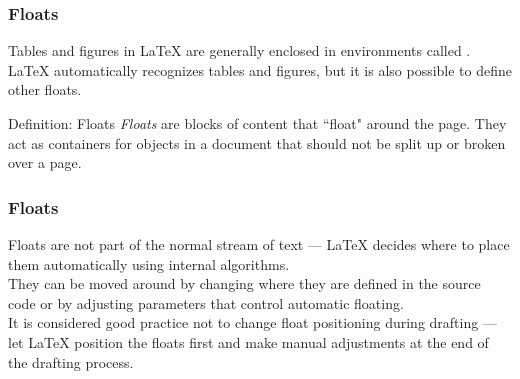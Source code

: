 \begin{frame}[fragile]
\frametitle{Floats}
Tables and figures in \LaTeX{} are generally enclosed in environments called . \\[\baselineskip] \pause
\LaTeX{} automatically recognizes tables and figures, but it is also possible to define other floats. \\ \pause
\begin{block}{Definition: Floats}
    \emph{Floats} are blocks of content that ``float" around the page. They act as containers for objects in a document that should not be split up or broken over a page.
\end{block} 
\end{frame}


\begin{frame}[fragile]
\frametitle{Floats}
Floats are not part of the normal stream of text --- \LaTeX{} decides where to place them automatically using internal algorithms. \\[\baselineskip] \pause
They can be moved around by changing where they are defined in the source code or by adjusting parameters that control automatic floating. \\[\baselineskip] \pause
It is considered good practice not to change float positioning during drafting --- let \LaTeX{} position the floats first and make manual adjustments at the end of the drafting process. 
\end{frame}


